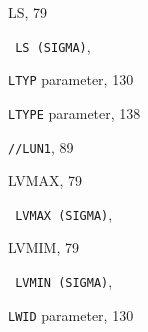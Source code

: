 \begin{theindex}
  \item {\ttfamily  LS}, 79
  \item \texttt  { LS \textrm  {(SIGMA)}}, 
  \item {\tt LTYP}
     parameter, 130
  \item {\tt LTYPE}
     parameter, 138
  \item {\tt//LUN1}, 89
  \item {\ttfamily  LVMAX}, 79
  \item \texttt  { LVMAX{ \textrm {(SIGMA)}}}, 
  \item {\ttfamily  LVMIM}, 79
  \item \texttt  { LVMIN{ \textrm {(SIGMA)}}}, 
  \item {\tt LWID}
     parameter, 130

  \indexspace


\end{theindex}
